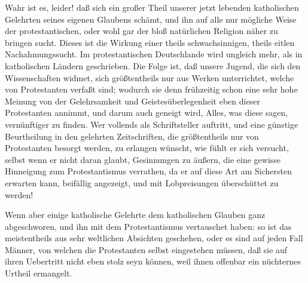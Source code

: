 \begin{aufza}
\begin{aufzb}
\item Wahr ist es, leider! daß sich ein großer Theil unserer jetzt lebenden katholischen Gelehrten seines eigenen Glaubens schämt, und ihn auf alle nur mögliche Weise der protestantischen, oder wohl gar der bloß natürlichen Religion näher zu bringen sucht. Dieses ist die Wirkung einer theils schwachsinnigen, theils eitlen Nachahmungssucht. Im protestantischen Deutschlande wird ungleich mehr, als in katholischen Ländern geschrieben. Die Folge ist, daß unsere Jugend, die sich den Wissenschaften widmet, sich größtentheils nur aus Werken unterrichtet, welche von Protestanten verfaßt sind; wodurch sie denn frühzeitig schon eine sehr hohe Meinung von der Gelehrsamkeit und Geistesüberlegenheit eben dieser Protestanten annimmt, und darum auch geneigt wird, Alles, was diese sagen, vernünftiger zu finden. Wer vollends als Schriftsteller auftritt, und eine günstige Beurtheilung in den gelehrten Zeitschriften, die größtentheils nur von Protestanten besorgt werden, zu erlangen wünscht, wie fühlt er sich versucht, selbst wenn er nicht daran glaubt, Gesinnungen zu äußern, die eine gewisse Hinneigung zum Protestantismus verrathen, da er auf diese Art am Sichersten erwarten kann, beifällig angezeigt, und mit Lobpreisungen überschüttet zu werden!
\item Wenn aber einige katholische Gelehrte dem katholischen Glauben ganz abgeschworen, und ihn mit dem Protestantismus vertauschet haben: so ist das meistentheils aus sehr weltlichen Absichten geschehen, oder es sind auf jeden Fall Männer, von welchen die Protestanten selbst eingestehen müssen, daß sie auf ihren Uebertritt nicht eben stolz seyn können, weil ihnen offenbar ein nüchternes Urtheil ermangelt.~

\end{aufzb}
\end{aufza}
